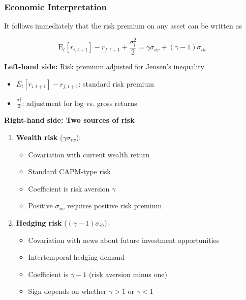 \documentclass{beamer}
\begin{document}
\begin{frame}[allowframebreaks]
    \frametitle{Economic Interpretation}
    It follows immediately that the risk premium on any asset can be written as

   \begin{tcolorbox}[colback=red!5!white, colframe=red!75!black, title=SDF Innovation (Without consumption)]
    \begin{equation*}
        \mathrm{E}_t\left[r_{i, t+1}\right]-r_{f, t+1}+\frac{\sigma_i^2}{2}=\gamma \sigma_{i w}+(\gamma-1) \sigma_{i h}
    \end{equation*}
    \end{tcolorbox}

    
    \textbf{Left-hand side:} Risk premium adjusted for Jensen's inequality
    \begin{itemize}
        \item $E_t[r_{i,t+1}] - r_{f,t+1}$: standard risk premium
        \item $\frac{\sigma_i^2}{2}$: adjustment for log vs. gross returns
    \end{itemize}
    
    \textbf{Right-hand side: Two sources of risk}
    
    \begin{enumerate}
        \item \textbf{Wealth risk} ($\gamma \sigma_{iw}$):
        \begin{itemize}
            \item Covariation with current wealth return
            \item Standard CAPM-type risk
            \item Coefficient is risk aversion $\gamma$
            \item Positive $\sigma_{iw}$ requires positive risk premium
        \end{itemize}
        
        \framebreak
        
        \item \textbf{Hedging risk} ($(\gamma-1)\sigma_{ih}$):
        \begin{itemize}
            \item Covariation with news about future investment opportunities
            \item Intertemporal hedging demand
            \item Coefficient is $\gamma - 1$ (risk aversion minus one)
            \item Sign depends on whether $\gamma > 1$ or $\gamma < 1$
        \end{itemize}
    \end{enumerate}
    

\end{frame}
\end{document}
